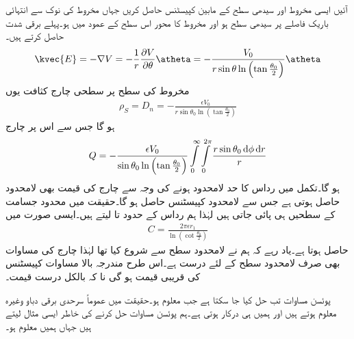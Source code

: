 آئیں ایسی مخروط اور سیدھی سطح کے مابین کپیسٹنس حاصل کریں جہاں مخروط کی نوک سے انتہائی باریک فاصلے پر سیدھی سطح ہو اور مخروط کا محور اس سطح کے عمود میں ہو۔پہلے برقی شدت حاصل کرتے ہیں۔
\begin{align}
\kvec{E}=-\nabla V=-\frac{1}{r} \frac{\partial V}{\partial \theta} \atheta=-\frac{V_0}{r \sin \theta  \ln \left (\tan \frac{\theta_0}{2} \right)} \atheta
\end{align}
مخروط کی سطح پر سطحی چارج کثافت یوں
\begin{align*}
\rho_S=D_n=-\frac{\epsilon V_0}{r \sin \theta_0  \ln \left (\tan \frac{\theta_0}{2} \right)}
\end{align*}
ہو گا جس سے اس پر چارج
\begin{align*}
Q=-\frac{\epsilon V_0}{\sin \theta_0  \ln \left (\tan \frac{\theta_0}{2} \right)}\int \limits_0^\infty \int \limits_0^{2\pi}\frac{r \sin \theta_0 \dif \phi \dif r}{r}
\end{align*}
ہو گا۔تکمل میں رداس کا حد لامحدود ہونے کی وجہ سے چارج کی قیمت بھی لامحدود حاصل ہوتی ہے جس سے لامحدود کپیسٹنس حاصل ہو گا۔حقیقت میں محدود جسامت کے سطحیں ہی پائی جاتی ہیں لہٰذا ہم رداس کے حدود  تا  لیتے ہیں۔ایسی صورت میں
\begin{align}\label{مساوات_لاپلاس_مخروطی_کپیسٹنس}
C=\frac{2\pi \epsilon r_1}{\ln \left(\cot \frac{\theta_0}{2} \right)}
\end{align}
حاصل ہوتا ہے۔یاد رہے کہ ہم نے لامحدود سطح سے شروع کیا تھا لہٰذا چارج کی مساوات بھی صرف لامحدود سطح کے لئے درست ہے۔اس طرح مندرجہ بالا مساوات کپیسٹنس کی قریبی قیمت ہو گی نا کہ بالکل درست قیمت۔ 

پوئسن مساوات تب حل کیا جا سکتا ہے جب  معلوم ہو۔حقیقت میں عموماً سرحدی برقی دباو وغیرہ معلوم ہوتے ہیں اور ہمیں  ہی درکار ہوتی ہے۔ہم پوئسن مساوات حل کرنے کی خاطر ایسی مثال لیتے ہیں جہاں ہمیں  معلوم ہو۔

